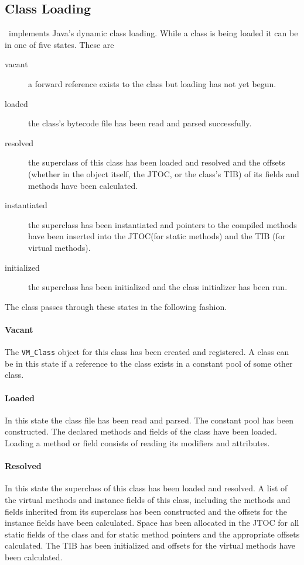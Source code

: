 \subsection{Class Loading} \label{sssec:classLoading}

\jp\ implements Java's dynamic class loading. While a class is being loaded it
can be in one of five states. These are
\begin{description}
\item[vacant] a forward reference exists to the class but loading has not yet 
begun.
\item[loaded] the class's bytecode file has been read and parsed successfully.
\item[resolved] the superclass of this class has been loaded and resolved and
the offsets (whether in the object itself, the JTOC, or the class's TIB) of its 
fields and methods have been calculated.
\item[instantiated] the superclass has been instantiated and pointers to the
compiled methods have been inserted into the JTOC(for static methods) and the
TIB (for virtual methods).
\item[initialized] the superclass has been initialized and the class
initializer has been run.
\end{description}

The class passes through these states in the following fashion.

\paragraph{Vacant}
The {\tt VM\_Class} object for this class has been created and registered. 
A class can be in this state if a reference to the class exists in a constant
pool of some other class.

\paragraph{Loaded} 
In this state the class file has been read and parsed.  The constant pool has 
been constructed. The declared methods and fields of the class have been loaded.
Loading a method or field consists of reading its modifiers and attributes.

\paragraph{Resolved}
In this state the superclass of this class has been loaded and resolved. 
A list of the virtual methods and instance fields of this class, including the 
methods and fields
inherited from its superclass has been constructed and the offsets for the 
instance fields have been calculated.  
Space has been allocated in the JTOC for all static fields of the class and for
static method pointers and the appropriate offsets calculated.
The TIB has been initialized and offsets for the virtual methods have been
calculated.


